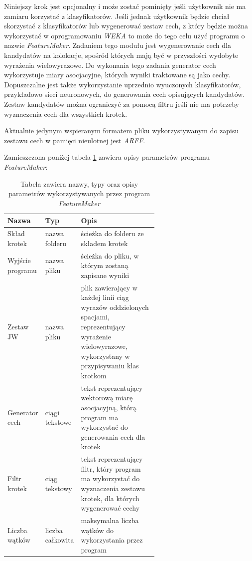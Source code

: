 \documentclass[11pt,a4paper]{llncs}
\begin{document}
Niniejszy krok jest opcjonalny i może zostać pominięty jeśli użytkownik nie ma zamiaru korzystać z klasyfikatorów.
Jeśli jednak użytkownik będzie chciał skorzystać z klasyfikatorów lub wygenerować zestaw cech, z który będzie można wykorzystać w oprogramowaniu \emph{WEKA} to może do tego celu użyć programu o nazwie \emph{FeatureMaker}.
Zadaniem tego modułu jest wygenerowanie cech dla kandydatów na kolokacje, spośród których mają być w przyszłości wydobyte wyrażenia wielowyrazowe.
Do wykonania tego zadania generator cech wykorzystuje miary asocjacyjne, których wyniki traktowane są jako cechy.
Dopuszczalne jest także wykorzystanie uprzednio wyuczonych klasyfikatorów, przykładowo sieci neuronowych, do generowania cech opisujących kandydatów.
Zestaw kandydatów można ograniczyć za pomocą filtru jeśli nie ma potrzeby wyznaczenia cech dla wszystkich krotek.
\par
Aktualnie jedynym wspieranym formatem pliku wykorzystywanym do zapisu zestawu cech w pamięci nieulotnej jest \emph{ARFF}.
\par
Zamieszczona poniżej tabela \ref{feature_maker_parameters} zawiera opisy parametrów programu \emph{FeatureMaker}:
\begin{table}[h!]
\centering
\begin{tabular}{l | l | p{0.6\linewidth}}
	\toprule 
	Nazwa & Typ & Opis \\
	\midrule 
	Skład krotek & nazwa folderu & ścieżka do folderu ze składem krotek \\ 
	\hline
	Wyjście programu & nazwa pliku & ścieżka do pliku, w którym zostaną zapisane wyniki\\ 
	\hline
	Zestaw JW & nazwa pliku & plik zawierający w każdej linii ciąg wyrazów oddzielonych spacjami, reprezentujący wyrażenie wielowyrazowe, wykorzystany w przypisywaniu klas krotkom\\ 
	\hline
	Generator cech & ciągi tekstowe & tekst reprezentujący wektorową miarę asocjacyjną, którą program ma wykorzystać do generowania cech dla krotek\\ 
	\hline
	Filtr krotek & ciąg tekstowy & tekst reprezentujący filtr, który program ma wykorzystać do wyznaczenia zestawu krotek, dla których wygenerować cechy\\ 
	\hline
	Liczba wątków & liczba całkowita & maksymalna liczba wątków do wykorzystania przez program\\ 
	\bottomrule
\end{tabular}
\caption[Parametry programu \emph{FeatureMaker}]{Tabela zawiera nazwy, typy oraz opisy parametrów wykorzystywanych przez program \emph{FeatureMaker}}
\label{feature_maker_parameters}
\end{table}
\end{document}

